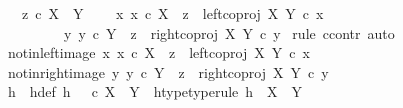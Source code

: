 \begin{isabellebody}
\ \ \ {\isachardoublequoteopen}z\ {\isasymin}\isactrlsub c\ X\ {\isasymCoprod}\ Y{\isachardoublequoteclose}\isanewline
\ \ \ {\isachardoublequoteopen}{\isacharparenleft}{\kern0pt}{\isasymexists}\ x{\isachardot}{\kern0pt}\ {\isacharparenleft}{\kern0pt}x\ {\isasymin}\isactrlsub c\ X\ {\isasymand}\ z\ {\isacharequal}{\kern0pt}\ {\isacharparenleft}{\kern0pt}left{\isacharunderscore}{\kern0pt}coproj\ X\ Y{\isacharparenright}{\kern0pt}\ {\isasymcirc}\isactrlsub c\ x{\isacharparenright}{\kern0pt}{\isacharparenright}{\kern0pt}\isanewline
\ \ \ \ \ \ {\isasymor}\ \ {\isacharparenleft}{\kern0pt}{\isasymexists}\ y{\isachardot}{\kern0pt}\ {\isacharparenleft}{\kern0pt}y\ {\isasymin}\isactrlsub c\ Y\ {\isasymand}\ z\ {\isacharequal}{\kern0pt}\ {\isacharparenleft}{\kern0pt}right{\isacharunderscore}{\kern0pt}coproj\ X\ Y{\isacharparenright}{\kern0pt}\ {\isasymcirc}\isactrlsub c\ y{\isacharparenright}{\kern0pt}{\isacharparenright}{\kern0pt}{\isachardoublequoteclose}\isanewline
%
\isadelimproof
%
\endisadelimproof
%
\isatagproof
{}\isamarkupfalse%
\ {\isacharparenleft}{\kern0pt}rule\ ccontr{\isacharcomma}{\kern0pt}\ auto{\isacharparenright}{\kern0pt}\isanewline
\ \ \isamarkupfalse%
\ not{\isacharunderscore}{\kern0pt}in{\isacharunderscore}{\kern0pt}left{\isacharunderscore}{\kern0pt}image{\isacharcolon}{\kern0pt}\ {\isachardoublequoteopen}{\isasymforall}x{\isachardot}{\kern0pt}\ x\ {\isasymin}\isactrlsub c\ X\ {\isasymlongrightarrow}\ z\ {\isasymnoteq}\ left{\isacharunderscore}{\kern0pt}coproj\ X\ Y\ {\isasymcirc}\isactrlsub c\ x{\isachardoublequoteclose}\isanewline
\ \ \isamarkupfalse%
\ not{\isacharunderscore}{\kern0pt}in{\isacharunderscore}{\kern0pt}right{\isacharunderscore}{\kern0pt}image{\isacharcolon}{\kern0pt}\ {\isachardoublequoteopen}{\isasymforall}y{\isachardot}{\kern0pt}\ y\ {\isasymin}\isactrlsub c\ Y\ {\isasymlongrightarrow}\ z\ {\isasymnoteq}\ right{\isacharunderscore}{\kern0pt}coproj\ X\ Y\ {\isasymcirc}\isactrlsub c\ y{\isachardoublequoteclose}\isanewline
\ \ \isanewline
\ \ \isamarkupfalse%
\ h\ \ h{\isacharunderscore}{\kern0pt}def{\isacharcolon}{\kern0pt}\ {\isachardoublequoteopen}h\ {\isacharequal}{\kern0pt}\ {\isasymf}\ {\isasymcirc}\isactrlsub c\ {\isasymbeta}\isactrlbsub X\ {\isasymCoprod}\ Y\isactrlesub {\isachardoublequoteclose}\ \ h{\isacharunderscore}{\kern0pt}type{\isacharbrackleft}{\kern0pt}type{\isacharunderscore}{\kern0pt}rule{\isacharbrackright}{\kern0pt}{\isacharcolon}{\kern0pt}\ {\isachardoublequoteopen}h\ {\isacharcolon}{\kern0pt}\ X\ {\isasymCoprod}\ Y\ {\isasymrightarrow}\ {\isasymOmega}{\isachardoublequoteclose}\isanewline

\end{isabellebody}
